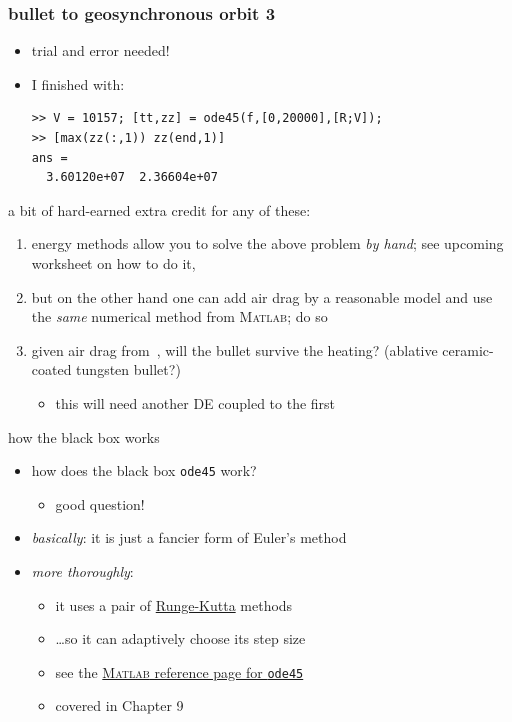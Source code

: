 \documentclass[dvipsnames,colorlinks]{beamer}
\newcommand{\Matlab}{\textsc{Matlab}\xspace}
\newcommand\enumnum[1]{{\renewcommand{\insertenumlabel}{#1}%
      \usebeamertemplate{enumerate item} \,}}
\begin{document}
\begin{frame}[fragile]
\frametitle{bullet to geosynchronous orbit 3}

\begin{itemize}
\item trial and error needed!
\item I finished with:
\begin{Verbatim}[fontsize=\footnotesize]
>> V = 10157; [tt,zz] = ode45(f,[0,20000],[R;V]);
>> [max(zz(:,1)) zz(end,1)]
ans =
  3.60120e+07  2.36604e+07
\end{Verbatim}
\end{itemize}

\bigskip
\small
a bit of hard-earned \alert{extra credit} for any of these:
\begin{enumerate}
\item energy methods allow you to solve the above problem \emph{by hand}; see upcoming worksheet on how to do it,
\item but on the other hand one can add air drag by a reasonable model and use the \emph{same} numerical method from \Matlab; do so
\item given air drag from \enumnum{2}, will the bullet survive the heating? (ablative ceramic-coated tungsten bullet?)
    \begin{itemize}
    \item this will need another DE coupled to the first
    \end{itemize}
\end{enumerate}
\end{frame}


\begin{frame}{how the black box works}

\begin{itemize}
\item how does the black box \alert{\texttt{ode45}} work?
    \begin{itemize}
    \item good question!
    \end{itemize}
\item \emph{basically}:  it is just a fancier form of Euler's method
\item \emph{more thoroughly}:
    \begin{itemize}
    \item it uses a pair of \href{https://en.wikipedia.org/wiki/Runge_Kutta_methods}{Runge-Kutta} methods
    \item \dots so it can adaptively choose its step size
    \item see the \href{https://www.mathworks.com/help/matlab/ref/ode45.html}{\Matlab reference page for \texttt{ode45}}
    \item covered in Chapter 9
    \end{itemize}
\end{itemize}
\end{frame}
\end{document}
